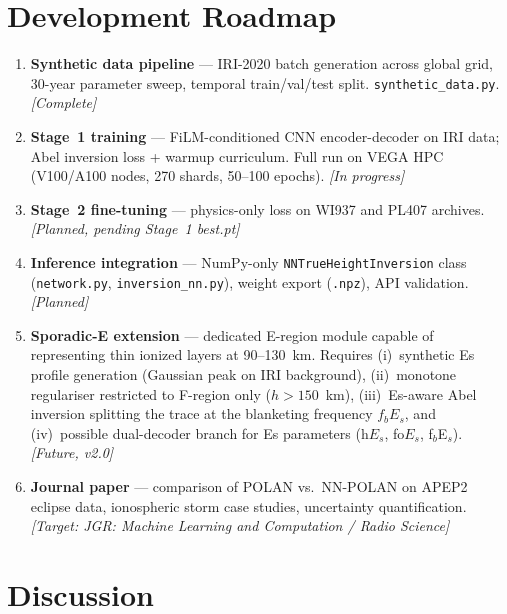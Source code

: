 \documentclass[11pt,twocolumn]{article}
\begin{document}
\section{Development Roadmap}

\begin{enumerate}[leftmargin=1.4em, itemsep=2pt, topsep=3pt]
  \item \textbf{Synthetic data pipeline} — IRI-2020 batch generation across
        global grid, 30-year parameter sweep, temporal train/val/test split.
        \texttt{synthetic\_data.py}.
        \emph{[Complete]}
  \item \textbf{Stage~1 training} — FiLM-conditioned CNN encoder-decoder on
        IRI data; Abel inversion loss + warmup curriculum.
        Full run on VEGA HPC (V100/A100 nodes, 270 shards, 50--100 epochs).
        \emph{[In progress]}
  \item \textbf{Stage~2 fine-tuning} — physics-only loss on WI937 and PL407
        archives.
        \emph{[Planned, pending Stage~1 best.pt]}
  \item \textbf{Inference integration} — NumPy-only \texttt{NNTrueHeightInversion}
        class (\texttt{network.py}, \texttt{inversion\_nn.py}), weight export
        (\texttt{.npz}), API validation.
        \emph{[Planned]}
  \item \textbf{Sporadic-E extension} — dedicated E-region module capable of
        representing thin ionized layers at 90--130~km.
        Requires (i)~synthetic Es profile generation (Gaussian peak on IRI
        background), (ii)~monotone regulariser restricted to F-region only
        ($h > 150$~km), (iii)~Es-aware Abel inversion splitting the trace at
        the blanketing frequency $f_{b}E_s$, and (iv)~possible dual-decoder
        branch for Es parameters (h$E_s$, fo$E_s$, f$_b$E$_s$).
        \emph{[Future, v2.0]}
  \item \textbf{Journal paper} — comparison of POLAN vs.\ NN-POLAN on APEP2
        eclipse data, ionospheric storm case studies, uncertainty quantification.
        \emph{[Target: JGR: Machine Learning and Computation / Radio Science]}
\end{enumerate}

\section{Discussion}
\end{document}
